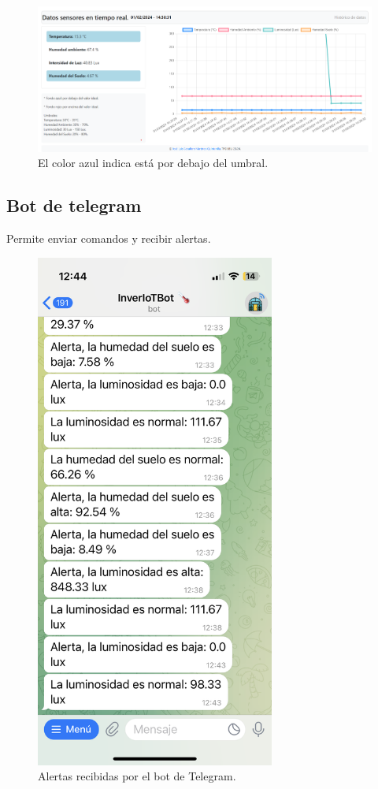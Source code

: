\begin{figure}[h]
\centering
\includegraphics[width=1\textwidth]{img/desarrollo/Dashboard2.png}
\caption{El color azul indica está por debajo del umbral.}
\end{figure}

\subsection{Bot de telegram}
Permite enviar comandos y recibir alertas.

\begin{figure}[h]
\centering
\includegraphics[width=0.7\textwidth]{img/desarrollo/BotTelegram_alertas.png}
\caption{Alertas recibidas por el bot de Telegram.}
\end{figure}

